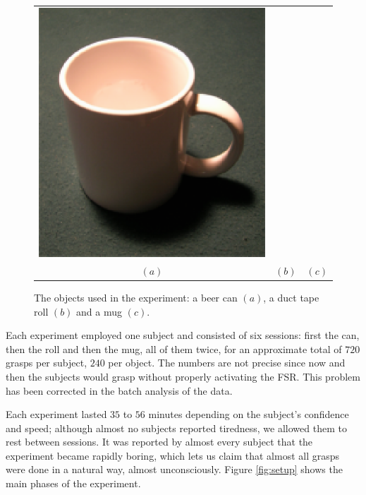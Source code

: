 \begin{figure}[htbp]
\begin{center}
\begin{tabular}{ccc}
      \includegraphics[height=0.2\textheight]{mug.eps} \\
      $(a)$ & $(b)$ & $(c)$
    \end{tabular}
    \caption{The objects used in the experiment: a beer can $(a)$, a
    duct tape roll $(b)$ and a mug $(c)$.}
    \label{fig:objects}
  \end{center}
\end{figure}

Each experiment employed one subject and consisted of six sessions:
first the can, then the roll and then the mug, all of them twice,
for an approximate total of $720$ grasps per subject, $240$ per
object. The numbers are not precise since now and then the subjects
would grasp without properly activating the FSR. This problem has been
corrected in the batch analysis of the data.

Each experiment lasted $35$ to $56$ minutes depending on the subject's
confidence and speed; although almost no subjects reported tiredness,
we allowed them to rest between sessions. It was reported by almost
every subject that the experiment became rapidly boring, which lets us
claim that almost all grasps were done in a natural way, almost
unconsciously. Figure \ref{fig:setup} shows the main phases of the
experiment.

